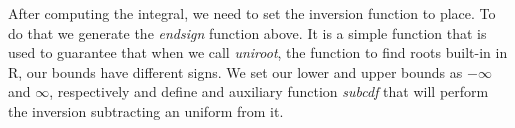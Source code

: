 \documentclass[12pt,twoside]{reedthesis}
\theoremstyle{definition}
\theoremstyle{definition}
\theoremstyle{remark}
\begin{document}
  \footnotesize
  \begin{Shaded}
  \begin{Highlighting}[]
  \StringTok{ }
      
  \StringTok{ }
        \NormalTok{(}\OperatorTok{*}\StringTok{ }\NormalTok{(}\OperatorTok{-}\OperatorTok{*}\StringTok{ }\OperatorTok{*}\StringTok{ }\OperatorTok{/}
  \NormalTok{    \}}
  \NormalTok{  \}}
    
  \StringTok{ }
  \StringTok{ } \OperatorTok{-}\StringTok{ }\OperatorTok{/}\OperatorTok{*}\StringTok{ }\OperatorTok{::}\NormalTok{(} \NormalTok{, } \NormalTok{,}
                                   \NormalTok{, } \NormalTok{)}\OperatorTok{$}
  \NormalTok{  \}}
    
    
  \StringTok{ } \NormalTok{) \{}
  \StringTok{ }
      \OperatorTok{*}\StringTok{ }\OperatorTok{<}\StringTok{ }\StringTok{ } \OperatorTok{*}\StringTok{ }
  \NormalTok{  \}}
  \end{Highlighting}
  \end{Shaded}
  \normalsize
  
  After computing the integral, we need to set the inversion function to
  place. To do that we generate the \emph{endsign} function above. It is a
  simple function that is used to guarantee that when we call
  \emph{uniroot}, the function to find roots built-in in R, our bounds
  have different signs. We set our lower and upper bounds as \(- \infty\)
  and \(\infty\), respectively and define and auxiliary function
  \emph{subcdf} that will perform the inversion subtracting an uniform
  from it.
  
\end{document}
